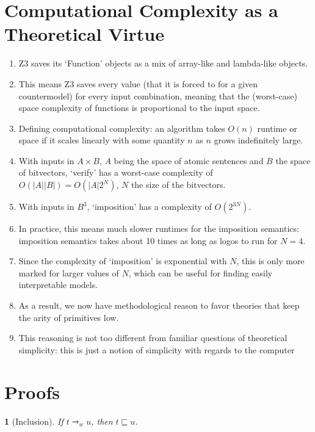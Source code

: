 \documentclass[a4paper, 11pt]{article} %
\theoremstyle{Pthm}
\newtheorem{Pthm}{}[section]%
\newcommand{\abs}[1]{|#1|} %
\begin{document}
\section*{Computational Complexity as a Theoretical Virtue}%
\begin{enumerate}[leftmargin=1in]
	\item Z3 saves its `Function' objects as a mix of array-like and lambda-like objects.
	\item This means Z3 saves every value (that it is forced to for a given countermodel) for every input combination, meaning that the (worst-case) space complexity of functions is proportional to the input space. 
	\item Defining computational complexity: an algorithm takes $O(n)$ runtime or space if it scales linearly with some quantity $n$ as $n$ grows indefinitely large. 
	\item With inputs in $A \times B$, $A$ being the space of atomic sentences and $B$ the space of bitvectors, `verify' has a worst-case complexity of $O(\abs{A} \abs{B}) = O(\abs{A} 2^N)$, $N$ the size of the bitvectors.
	\item With inputs in $B^3$, `imposition' has a complexity of $O(2^{3N})$. 
	\item In practice, this means much slower runtimes for the imposition semantics: imposition semantics takes about 10 times as long as logos to run for $N=4$. 
	\item Since the complexity of `imposition' is exponential with $N$, this is only more marked for larger values of $N$, which can be useful for finding easily interpretable models. 
	\item As a result, we now have methodological reason to favor theories that keep the arity of primitives low.
	\item This reasoning is not too different from familiar questions of theoretical simplicity: this is just a notion of simplicity with regards to the computer
\end{enumerate}



\section*{Proofs}%

\begin{Pthm}[\sc Inclusion] \label{app:Inclusion}
  If $t \rightarrowtriangle_w u$, then $t \sqsubseteq u$.
\end{Pthm}
\end{document}
